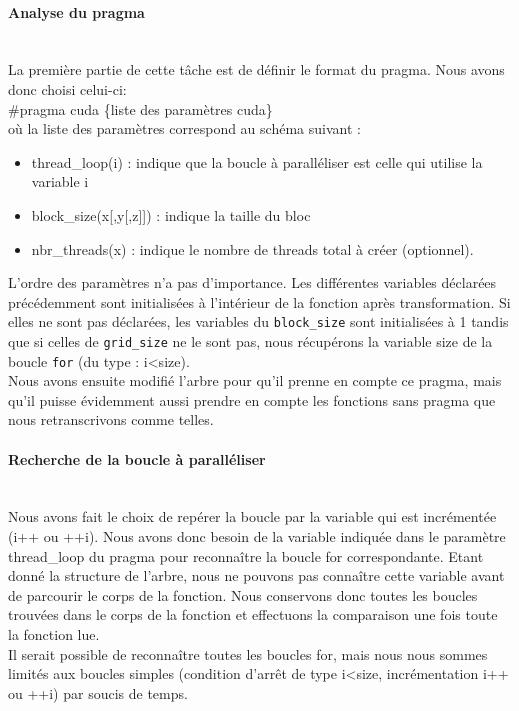 \documentclass{article}
\begin{document}
	\paragraph{Analyse du pragma}
	~~\\
	\indent
	La première partie de cette tâche est de définir le format du pragma. Nous avons donc choisi celui-ci:
	\\\#pragma cuda \{liste des paramètres cuda\}
	\\où la liste des paramètres correspond au schéma suivant :
	\begin{itemize}
		\item thread\_loop(i) : indique que la boucle à paralléliser est celle qui utilise la variable i
		\item block\_size(x[,y[,z]]) : indique la taille du bloc
		\item nbr\_threads(x) : indique le nombre de threads total à créer (optionnel).
	\end{itemize}
	L'ordre des paramètres n'a pas d'importance.
	Les différentes variables déclarées précédemment sont initialisées à l'intérieur de la fonction après transformation.
	Si elles ne sont pas déclarées, les variables du \verb|block_size| sont initialisées à 1 tandis que si celles de \verb|grid_size| ne le sont pas, nous récupérons la variable size de la boucle \verb|for| (du type : i\textless size).
	\\Nous avons ensuite modifié l'arbre pour qu'il prenne en compte ce pragma, mais qu'il puisse évidemment aussi prendre en compte les fonctions sans pragma que nous retranscrivons comme telles.
		
	
	\paragraph{Recherche de la boucle à paralléliser}
	~~\\
	\indent
	Nous avons fait le choix de repérer la boucle par la variable qui est incrémentée (i++ ou ++i). Nous avons donc besoin de la variable indiquée dans le paramètre thread\_loop du pragma pour reconnaître la boucle for correspondante. Etant donné la structure de l'arbre, nous ne pouvons pas connaître cette variable avant de parcourir le corps de la fonction. Nous conservons donc toutes les boucles trouvées dans le corps de la fonction et effectuons la comparaison une fois toute la fonction lue.
	\\Il serait possible de reconnaître toutes les boucles for, mais nous nous sommes limités aux boucles simples (condition d'arrêt de type i\textless size, incrémentation i++ ou ++i) par soucis de temps.
	
\end{document}
